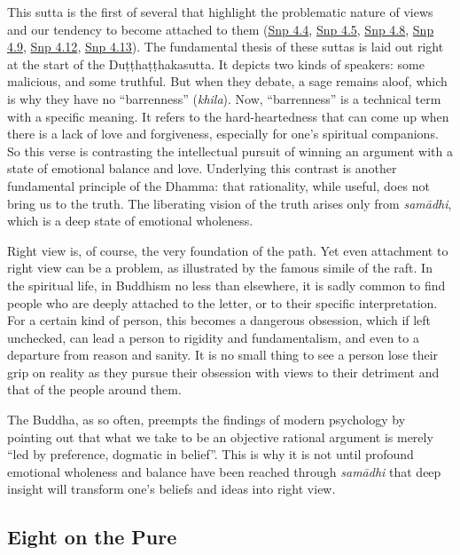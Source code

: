 \documentclass[12pt,openany]{book}%
\begin{document}
This sutta is the first of several that highlight the problematic nature of views and our tendency to become attached to them (\href{https://suttacentral.net/snp4.4/en/sujato}{Snp 4.4}, \href{https://suttacentral.net/snp4.5/en/sujato}{Snp 4.5}, \href{https://suttacentral.net/snp4.8/en/sujato}{Snp 4.8}, \href{https://suttacentral.net/snp4.9/en/sujato}{Snp 4.9}, \href{https://suttacentral.net/snp4.12/en/sujato}{Snp 4.12}, \href{https://suttacentral.net/snp4.13/en/sujato}{Snp 4.13}). The fundamental thesis of these suttas is laid out right at the start of the \textsanskrit{Duṭṭhaṭṭhakasutta}. It depicts two kinds of speakers: some malicious, and some truthful. But when they debate, a sage remains aloof, which is why they have no “barrenness” (\textit{khila}). Now, “barrenness” is a technical term with a specific meaning. It refers to the hard-heartedness that can come up when there is a lack of love and forgiveness, especially for one’s spiritual companions. So this verse is contrasting the intellectual pursuit of winning an argument with a state of emotional balance and love. Underlying this contrast is another fundamental principle of the Dhamma: that rationality, while useful, does not bring us to the truth. The liberating vision of the truth arises only from \textit{\textsanskrit{samādhi}}, which is a deep state of emotional wholeness.

Right view is, of course, the very foundation of the path. Yet even attachment to right view can be a problem, as illustrated by the famous simile of the raft. In the spiritual life, in Buddhism no less than elsewhere, it is sadly common to find people who are deeply attached to the letter, or to their specific interpretation. For a certain kind of person, this becomes a dangerous obsession, which if left unchecked, can lead a person to rigidity and fundamentalism, and even to a departure from reason and sanity. It is no small thing to see a person lose their grip on reality as they pursue their obsession with views to their detriment and that of the people around them.

The Buddha, as so often, preempts the findings of modern psychology by pointing out that what we take to be an objective rational argument is merely “led by preference, dogmatic in belief”. This is why it is not until profound emotional wholeness and balance have been reached through \textit{\textsanskrit{samādhi}} that deep insight will transform one’s beliefs and ideas into right view.

\subsection*{Eight on the Pure}
\end{document}
